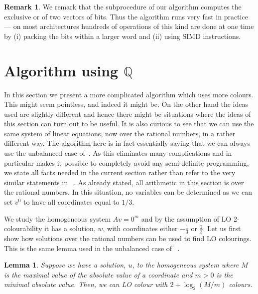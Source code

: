 \documentclass[a4paper,11pt]{article}
\theoremstyle{plain}
\newtheorem{lemma}[theorem]{Lemma}
\theoremstyle{definition}
\newtheorem{remark}[theorem]{Remark}
\begin{document}
\begin{remark}
 We remark that the subprocedure of our algorithm computes the exclusive or
of two vectors of bits. Thus the algorithm runs very fast in practice ---
  on most architectures hundreds of operations of this kind are done at one time by (i) packing the bits within a larger word and (ii) using SIMD instructions.
\end{remark}


\section{\texorpdfstring{Algorithm using $\mathbb{Q}$}{Algorithm using Q}}
\label{sec:algoQ}

In this section we present a more complicated algorithm
which uses more colours.  This
might seem pointless, and indeed it might be.  On the
other hand the ideas used are slightly different and hence there
might be situations where the ideas of this section can
turn out to be useful.  It is also curious to see that we can use the same system
of linear equations, now over the rational numbers, in a
rather different way.  The algorithm here is in fact essentially
saying that we can always use the unbalanced case of~\cite{LNR24:arxiv}.   As this eliminates many complications
and in particular makes it possible to completely avoid
any semi-definite programming, we state all facts needed in
the current section rather than refer to the very similar
statements in ~\cite{LNR24:arxiv}.
As already stated, all arithmetic in this section is over
the rational numbers.  In this situation, no variables can
be determined as we can set $v^0$ to
have all coordinates equal to $1/3$.  

We study the homogeneous system $Av=0^m$ and
by the assumption of LO 2-colourability it has
a solution, $w$, with coordinates either $-\frac 13$ or $\frac 23$.
Let us first show how
solutions over the rational numbers can be used to find LO colourings.
This is the same lemma used in the unbalanced case of ~\cite{LNR24:arxiv}.

\begin{lemma}\label{lemma:unbal}
Suppose we have a solution, $u$, to the homogeneous system where $M$
is the maximal value of the absolute value of a coordinate
and $m > 0$ is the minimal absolute value.  Then, we can
LO colour with $2+\log_2{(M/m)}$ colours.
\end{lemma}
\end{document}
